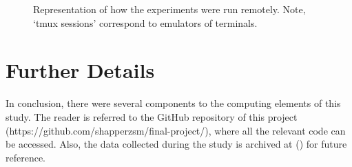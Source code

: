 \begin{figure}
    \centering
    \resizebox{\textwidth}{!}{}
    \caption{Representation of how the experiments were run remotely. Note, `tmux sessions' correspond to emulators of terminals.}\label{fig:restate_remote_comp}
\end{figure}

\section{Further Details}
In conclusion, there were several components to the computing elements of this
study. The reader is referred to the GitHub repository of this 
project \\ (https://github.com/shapperzsm/final-project/),
where all the relevant code can be accessed. Also, the data collected during the
study is archived at () for future reference.